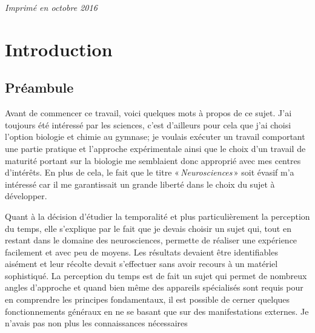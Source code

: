 \documentclass[12pt,fleqn,oneside,openany]{book} %
\begin{document}
\noindent \textit{Imprimé en octobre 2016} 



\pagestyle{empty} %

\tableofcontents %


\pagestyle{fancy} %



\chapter{Introduction} \label{cha:introduction}
\section{Préambule}
Avant de commencer ce travail, voici quelques mots à propos de ce sujet. J'ai toujours été intéressé par les sciences, c'est d'ailleurs pour cela que j'ai choisi l'option biologie et chimie au gymnase; je voulais exécuter un travail comportant une partie pratique et l'approche expérimentale ainsi que le choix d'un travail de maturité portant sur la biologie me semblaient donc approprié avec mes centres d'intérêts. En plus de cela, le fait que le titre «\,\emph{Neurosciences}\,» soit évasif m'a intéressé car il me garantissait un grande liberté dans le choix du sujet à développer.

Quant à la décision d'étudier la temporalité et plus particulièrement la perception du temps, elle s'explique par le fait que je devais choisir un sujet qui, tout en restant dans le domaine des neurosciences, permette de réaliser une expérience facilement et avec peu de moyens. Les résultats devaient être identifiables aisément et leur récolte devait s'effectuer sans avoir recours à un matériel sophistiqué. La perception du temps est de fait un sujet qui permet de nombreux angles d'approche et quand bien même des appareils spécialisés sont requis pour en comprendre les principes fondamentaux, il est possible de cerner quelques fonctionnements généraux en ne se basant que sur des manifestations externes. Je n'avais pas non plus les connaissances nécessaires 
\end{document}
